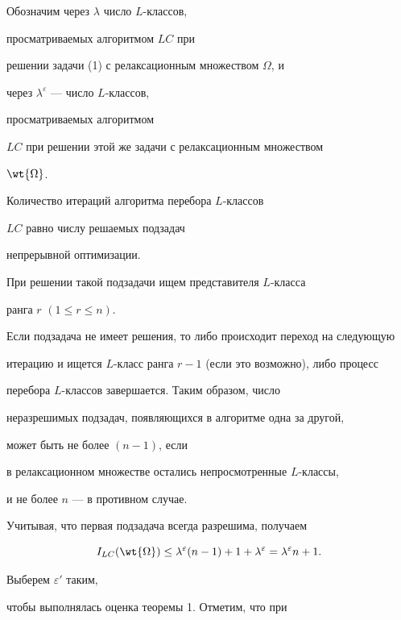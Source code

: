 \begin{pf}


Обозначим через $ \lambda$  число  $L$-классов,


просматриваемых алгоритмом $LC$ при


решении задачи (1) с релаксационным множеством $ \Omega$, и


через $\lambda^{ \varepsilon}$ --- число  $L$-классов, 


просматриваемых алгоритмом


$LC$ при решении этой же задачи с релаксационным множеством


$ \wt{ \Omega}$.





Количество итераций алгоритма перебора $L$-классов 


$LC$ равно числу решаемых подзадач


непрерывной оптимизации.


При решении такой подзадачи ищем представителя $L$-класса


ранга $r$ $(1 \leq r \leq n)$.


Если подзадача не имеет решения, то либо происходит переход на следующую


итерацию и ищется $L$-класс ранга $r-1$ (если это возможно), либо процесс


перебора $L$-классов завершается. Таким образом, число 


неразрешимых подзадач, появляющихся в алгоритме одна за другой, 


может быть не более $(n-1)$, если


в релаксационном множестве остались непросмотренные $L$-классы,


и не  более $n$ --- в противном случае.


Учитывая, что первая подзадача всегда разрешима, получаем


\begin{equation}


I_{LC}( \wt{ \Omega}) \leq \lambda^{ \varepsilon}(n-1) +


1 + \lambda^{ \varepsilon}


= \lambda^{ \varepsilon}n + 1.


\end{equation}





Выберем $ \varepsilon'$ таким, 


чтобы  выполнялась оценка теоремы 1. Отметим, что при 



\end{pf}

